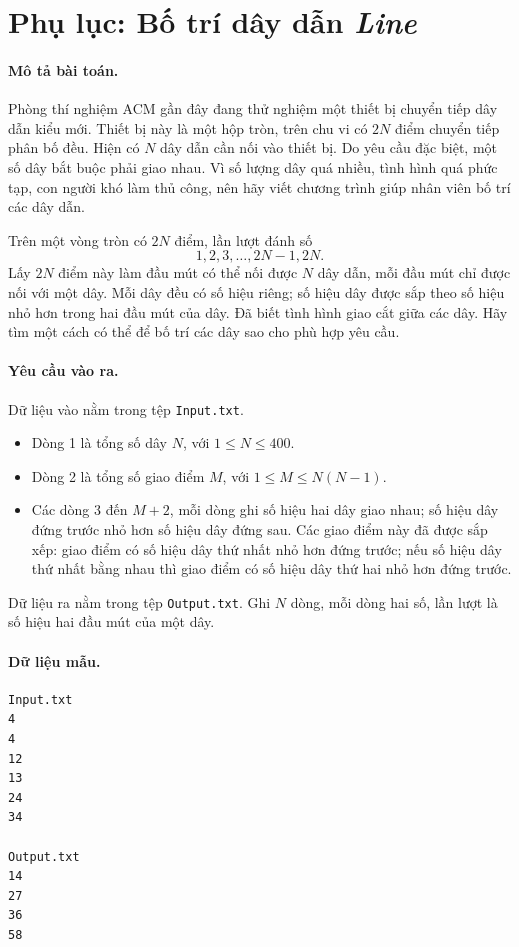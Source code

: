 \documentclass[11pt]{article}
\begin{document}
\section{Phụ lục: Bố trí dây dẫn \textit{Line}}

\paragraph{Mô tả bài toán.}
Phòng thí nghiệm ACM gần đây đang thử nghiệm một thiết bị chuyển tiếp dây dẫn
kiểu mới. Thiết bị này là một hộp tròn, trên chu vi có \(2N\) điểm chuyển
tiếp phân bố đều. Hiện có \(N\) dây dẫn cần nối vào thiết bị. Do yêu cầu đặc
biệt, một số dây bắt buộc phải giao nhau. Vì số lượng dây quá nhiều, tình
hình quá phức tạp, con người khó làm thủ công, nên hãy viết chương trình giúp
nhân viên bố trí các dây dẫn.

Trên một vòng tròn có \(2N\) điểm, lần lượt đánh số
\[
  1,2,3,\ldots,2N-1,2N.
\]
Lấy \(2N\) điểm này làm đầu mút có thể nối được \(N\) dây dẫn, mỗi đầu mút
chỉ được nối với một dây. Mỗi dây đều có số hiệu riêng; số hiệu dây được sắp
theo số hiệu nhỏ hơn trong hai đầu mút của dây. Đã biết tình hình giao cắt
giữa các dây. Hãy tìm một cách có thể để bố trí các dây sao cho phù hợp yêu
cầu.

\paragraph{Yêu cầu vào ra.}
Dữ liệu vào nằm trong tệp \texttt{Input.txt}.
\begin{itemize}
  \item Dòng 1 là tổng số dây \(N\), với \(1\le N\le 400\).
  \item Dòng 2 là tổng số giao điểm \(M\), với \(1\le M\le N(N-1)\).
  \item Các dòng \(3\) đến \(M+2\), mỗi dòng ghi số hiệu hai dây giao nhau;
  số hiệu dây đứng trước nhỏ hơn số hiệu dây đứng sau. Các giao điểm này đã
  được sắp xếp: giao điểm có số hiệu dây thứ nhất nhỏ hơn đứng trước; nếu số
  hiệu dây thứ nhất bằng nhau thì giao điểm có số hiệu dây thứ hai nhỏ hơn
  đứng trước.
\end{itemize}

Dữ liệu ra nằm trong tệp \texttt{Output.txt}. Ghi \(N\) dòng, mỗi dòng hai số,
lần lượt là số hiệu hai đầu mút của một dây.

\paragraph{Dữ liệu mẫu.}
\begin{verbatim}
Input.txt
4
4
12
13
24
34

Output.txt
14
27
36
58
\end{verbatim}
\end{document}
